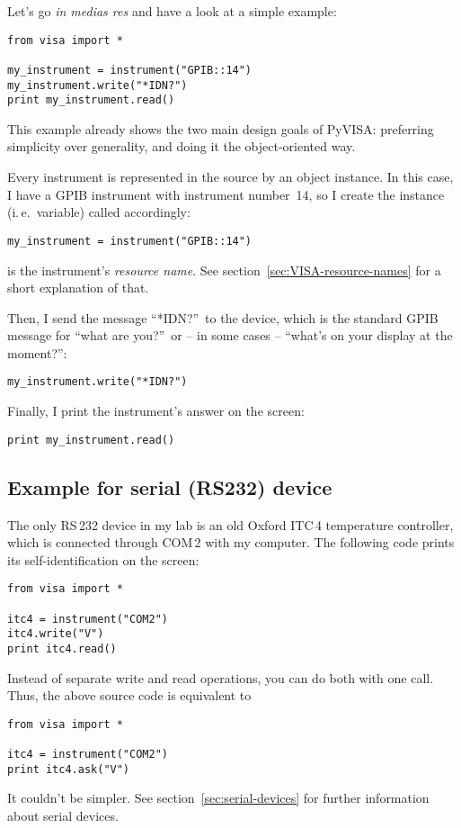 \documentclass{howto}
\begin{document}
Let's go \emph{in medias res} and have a look at a simple example:
\begin{verbatim}
from visa import *

my_instrument = instrument("GPIB::14")
my_instrument.write("*IDN?")
print my_instrument.read()
\end{verbatim}
This example already shows the two main design goals of PyVISA: preferring
simplicity over generality, and doing it the object-oriented way.

Every instrument is represented in the source by an object instance.  In this case,
I have a GPIB instrument with instrument number~14, so I create the instance
(i.\,e.\ variable) called  accordingly:
\begin{verbatim}
my_instrument = instrument("GPIB::14")
\end{verbatim}
 is the instrument's \emph{resource name}.  See
section~\ref{sec:VISA-resource-names} for a short explanation of that.

Then, I send the message ``*IDN?''\ to the device, which is the standard GPIB
message for ``what are you?''\ or -- in some cases -- ``what's on your display
at the moment?'':
\begin{verbatim}
my_instrument.write("*IDN?")
\end{verbatim}
Finally, I print the instrument's answer on the screen:
\begin{verbatim}
print my_instrument.read()
\end{verbatim}


\subsection{Example for serial (RS232) device}

The only RS\,232 device in my lab is an old Oxford ITC\,4 temperature
controller, which is connected through COM\,2 with my computer.  The following
code prints its self-identification on the screen:
\begin{verbatim}
from visa import *

itc4 = instrument("COM2")
itc4.write("V")
print itc4.read()
\end{verbatim}
Instead of separate write and read operations, you can do both with one
 call.  Thus, the above source code is equivalent to
\begin{verbatim}
from visa import *

itc4 = instrument("COM2")
print itc4.ask("V")
\end{verbatim}
It couldn't be simpler.  See section~\ref{sec:serial-devices} for further
information about serial devices.
\end{document}
